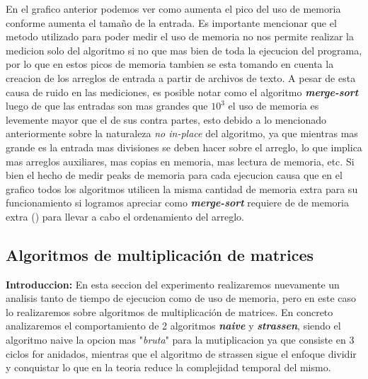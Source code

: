 \documentclass[11pt,spanish]{article} %
\begin{document}
En el grafico anterior podemos ver como aumenta el pico del uso de memoria conforme aumenta el tamaño de la entrada.\newline
Es importante mencionar que el metodo utilizado para poder medir el uso de memoria no nos permite realizar la medicion
solo del algoritmo si no que mas bien de toda la ejecucion del programa, por lo que en estos picos de memoria tambien se esta
tomando en cuenta la creacion de los arreglos de entrada a partir de archivos de texto.
A pesar de esta causa de ruido en las mediciones, es posible notar como el algoritmo \textbf{\textit{merge-sort}} luego de 
que las entradas son mas grandes que $10^{3}$ el uso de memoria es levemente mayor que el de sus contra partes, esto 
debido a lo mencionado anteriormente sobre la naturaleza \textit{no in-place} del algoritmo, ya que mientras mas grande es la 
entrada mas divisiones se deben hacer sobre el arreglo, lo que implica mas arreglos auxiliares, mas copias en memoria, mas 
lectura de memoria, etc.\newline
Si bien el hecho de medir peaks de memoria para cada ejecucion causa que en el grafico todos los algoritmos utilicen la misma 
cantidad de memoria extra para su funcionamiento si logramos apreciar como \textbf{\textit{merge-sort}} requiere de 
de memoria extra () para llevar a cabo el ordenamiento del arreglo.
\clearpage

\subsection{Algoritmos de multiplicación de matrices}
\textbf{Introduccion:} En esta seccion del experimento realizaremos nuevamente un analisis tanto de tiempo de ejecucion como
de uso de memoria, pero en este caso lo realizaremos sobre algoritmos de multiplicación de matrices.\newline
En concreto analizaremos el comportamiento de 2 algoritmos \textbf{\textit{naive}} y \textbf{\textit{strassen}}, 
siendo el algoritmo naive la opcion mas "\textit{bruta}" para la mutiplicacion ya que consiste en 3 ciclos for anidados, 
mientras que el algoritmo de strassen sigue el enfoque dividir y conquistar lo que en la teoria reduce la complejidad 
temporal del mismo.
\end{document}
